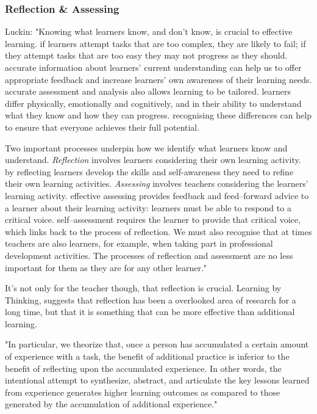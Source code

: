 \subsubsection{Reflection \& Assessing}

Luckin: "Knowing what learners know, and don’t know, is crucial to effective learning. if learners attempt tasks that are too complex, they are likely to fail; if they attempt tasks that are too easy they may not progress as they should. accurate information about learners’ current understanding can help us to offer appropriate feedback and increase learners’ own awareness of their learning needs. accurate assessment and analysis also allows learning to be tailored. learners differ physically, emotionally and cognitively, and in their ability to understand what they know and how they can progress. recognising these differences can help to ensure that everyone achieves their full potential.

Two important processes underpin how we identify what learners know and understand. \textit{Reflection} involves learners considering their own learning activity. by reflecting learners develop the skills and self-awareness they need to refine their own learning activities. \textit{Assessing} involves teachers considering the learners’ learning activity. effective assessing provides feedback and feed–forward advice to a learner about their learning activity: learners must be able to respond to a critical voice. self–assessment requires the learner to provide that critical voice, which links back to the process of reflection. We must
also recognise that at times teachers are also learners, for example, when taking part in professional development activities. The processes of reflection and assessment are no less important for them as they are for any other learner."

It's not only for the teacher though, that reflection is crucial. Learning by Thinking, %
suggests that reflection has been a overlooked area of research for a long time, but that it is something that can be more effective than additional learning.

"In particular, we theorize that, once a person has accumulated a certain amount of experience with a task, the benefit of additional practice is inferior to the benefit of reflecting upon the accumulated experience. In other words, the intentional attempt to synthesize, abstract, and articulate the key lessons learned from experience generates higher learning outcomes as compared to those generated by the accumulation of additional experience."

